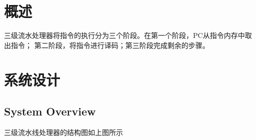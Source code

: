 \documentclass[UTF8]{ctexart}
\begin{document}


\section{概述} \label{overview}%
三级流水处理器将指令的执行分为三个阶段。在第一个阶段，PC从指令内存中取出指令；
第二阶段，将指令进行译码；第三阶段完成剩余的步骤。



\newpage
\section{系统设计} \label{sysdes}%
\subsection{System Overview}\label{sub:sysover}
三级流水线处理器的结构图如上图所示
\end{document}
